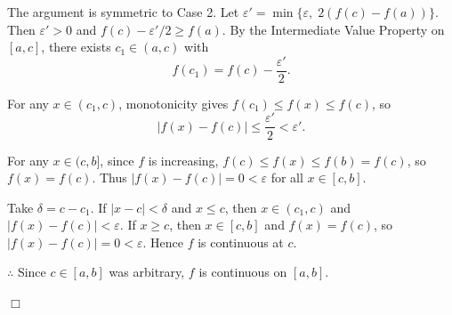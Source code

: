 \documentclass[reqno,11pt]{amsart}
\begin{document}
The argument is symmetric to Case 2. Let \(\varepsilon' = \min\{\varepsilon,\; 2(f(c)-f(a))\}\). Then \(\varepsilon'>0\) and \(f(c)-\varepsilon'/2 \ge f(a)\). By the Intermediate Value Property on \([a,c]\), there exists \(c_1 \in (a,c)\) with
\[
f(c_1) = f(c) - \frac{\varepsilon'}{2}.
\]

For any \(x \in (c_1, c)\), monotonicity gives \(f(c_1) \le f(x) \le f(c)\), so
\[
|f(x) - f(c)| \le \frac{\varepsilon'}{2} < \varepsilon'.
\]

For any \(x \in (c,b]\), since \(f\) is increasing, \(f(c) \le f(x) \le f(b) = f(c)\), so \(f(x) = f(c)\). Thus \(|f(x) - f(c)| = 0 < \varepsilon\) for all \(x \in [c,b]\).

Take \(\delta = c - c_1\). If \(|x - c| < \delta\) and \(x \le c\), then \(x \in (c_1, c)\) and \(|f(x)-f(c)| < \varepsilon\). If \(x \ge c\), then \(x \in [c,b]\) and \(f(x) = f(c)\), so \(|f(x)-f(c)| = 0 < \varepsilon\). Hence \(f\) is continuous at \(c\).

$\therefore$ Since \(c \in [a,b]\) was arbitrary, \(f\) is continuous on \([a,b]\).

\hfill$\Box$
\end{document}
